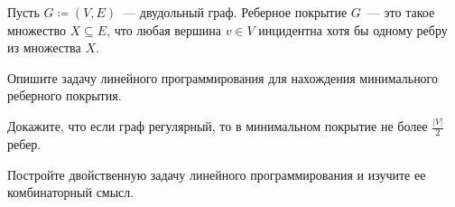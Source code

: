 Пусть $G \coloneqq (V, E)$~--- двудольный граф. Реберное покрытие $G$~--- это такое множество $X
\subseteq E$, что любая вершина $v \in V$ инцидентна хотя бы одному ребру из множества $X$.
\begin{enumcyr}
    \item Опишите задачу линейного программирования для нахождения минимального реберного покрытия.
    \item Докажите, что если граф регулярный, то в минимальном покрытие не более $\frac{|V|}{2}$ ребер.
    \item Постройте двойственную задачу линейного программирования и изучите ее комбинаторный смысл.
\end{enumcyr}

